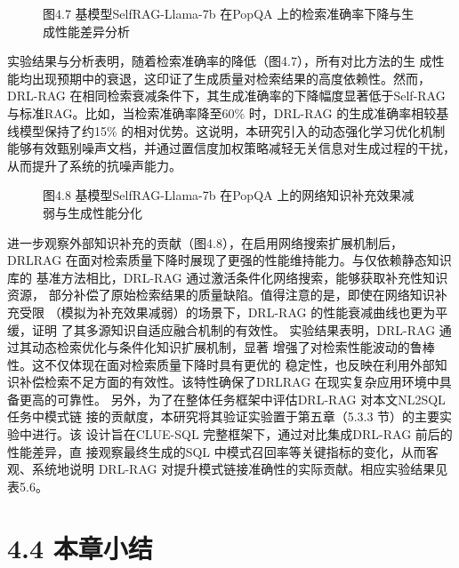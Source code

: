\documentclass[12pt,a4paper,openright,UTF8]{ctexbook}
\begin{document}
\begin{figure}[htbp]
\centering
{}
\caption{图4.7 基模型SelfRAG-Llama-7b 在PopQA 上的检索准确率下降与生成性能差异分析}
\end{figure}

实验结果与分析表明，随着检索准确率的降低（图4.7），所有对比方法的生 成性能均出现预期中的衰退，这印证了生成质量对检索结果的高度依赖性。然而， DRL-RAG 在相同检索衰减条件下，其生成准确率的下降幅度显著低于Self-RAG 与标准RAG。比如，当检索准确率降至60\% 时，DRL-RAG 的生成准确率相较基 线模型保持了约15\% 的相对优势。这说明，本研究引入的动态强化学习优化机制 能够有效甄别噪声文档，并通过置信度加权策略减轻无关信息对生成过程的干扰， 从而提升了系统的抗噪声能力。

\begin{figure}[htbp]
\centering
{}
\caption{图4.8 基模型SelfRAG-Llama-7b 在PopQA 上的网络知识补充效果减弱与生成性能分化}
\end{figure}

进一步观察外部知识补充的贡献（图4.8），在启用网络搜索扩展机制后，DRLRAG 在面对检索质量下降时展现了更强的性能维持能力。与仅依赖静态知识库的 基准方法相比，DRL-RAG 通过激活条件化网络搜索，能够获取补充性知识资源， 部分补偿了原始检索结果的质量缺陷。值得注意的是，即使在网络知识补充受限 （模拟为补充效果减弱）的场景下，DRL-RAG 的性能衰减曲线也更为平缓，证明 了其多源知识自适应融合机制的有效性。 实验结果表明，DRL-RAG 通过其动态检索优化与条件化知识扩展机制，显著 增强了对检索性能波动的鲁棒性。这不仅体现在面对检索质量下降时具有更优的 稳定性，也反映在利用外部知识补偿检索不足方面的有效性。该特性确保了DRLRAG 在现实复杂应用环境中具备更高的可靠性。 另外，为了在整体任务框架中评估DRL-RAG 对本文NL2SQL 任务中模式链 接的贡献度，本研究将其验证实验置于第五章（5.3.3 节）的主要实验中进行。该 设计旨在CLUE-SQL 完整框架下，通过对比集成DRL-RAG 前后的性能差异，直 接观察最终生成的SQL 中模式召回率等关键指标的变化，从而客观、系统地说明 DRL-RAG 对提升模式链接准确性的实际贡献。相应实验结果见表5.6。

\section{4.4 本章小结}
\end{document}
